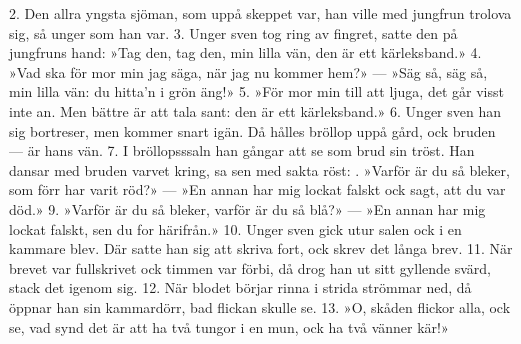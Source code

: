 \kern-25pt
\setlength{\columnsep}{0.5cm}
\begin{multicols}{2}
2.  Den allra yngsta sjöman,
    som uppå skeppet var,
    han ville med jungfrun trolova sig,
    så unger som han var.
3.  Unger sven tog ring av fingret,
    satte den på jungfruns hand:
    »Tag den, tag den, min lilla vän,
    den är ett kärleksband.»
4.  »Vad ska för mor min jag säga,
    när jag nu kommer hem?» —
    »Säg så, säg så, min lilla vän:
    du hitta’n i grön äng!»
5.  »För mor min till att ljuga,
    det går visst inte an.
    Men bättre är att tala sant:
    den är ett kärleksband.»
6.  Unger sven han sig bortreser,
    men kommer snart igän.
    Då hålles bröllop uppå gård,
    ock bruden — är hans vän.
7.  I bröllopsssaln han gångar
    att se som brud sin tröst.
    Han dansar med bruden varvet kring,
    sa sen med sakta röst:
\vfill{}.  »Varför är du så bleker,
    som förr har varit röd?» —
    »En annan har mig lockat falskt
    ock sagt, att du var död.»
9.  »Varför är du så bleker,
    varför är du så blå?» —
    »En annan har mig lockat falskt,
    sen du for härifrån.»
10. Unger sven gick utur salen
    ock i en kammare blev.
    Där satte han sig att skriva fort,
    ock skrev det långa brev.
11. När brevet var fullskrivet
    ock timmen var förbi,
    då drog han ut sitt gyllende svärd,
    stack det igenom sig.
12. När blodet börjar rinna
    i strida strömmar ned,
    då öppnar han sin kammardörr,
    bad flickan skulle se.
13. »O, skåden flickor alla,
    ock se, vad synd det är
    att ha två tungor i en mun,
    ock ha två vänner kär!»
\end{multicols}
